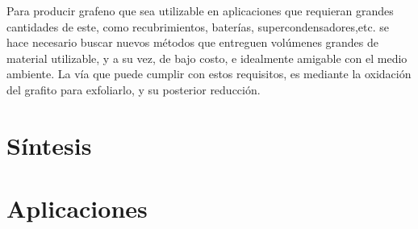 Para producir grafeno que sea utilizable en aplicaciones que requieran grandes cantidades de este, como recubrimientos, baterías, supercondensadores,etc. se hace necesario buscar nuevos métodos que entreguen volúmenes grandes de material utilizable, y a su vez, de bajo costo, e idealmente amigable con el medio ambiente. La vía que puede cumplir con estos requisitos, es mediante la oxidación del grafito para exfoliarlo, y su posterior reducción.

\section{Síntesis}


\section{Aplicaciones}